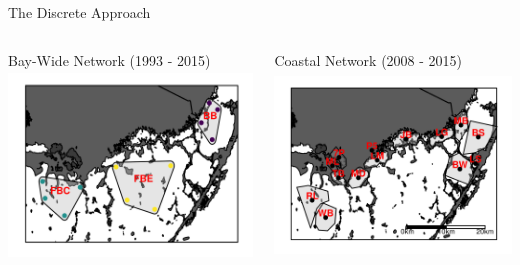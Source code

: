 \documentclass[compress,noflama,nosectionpages]{beamer}
\begin{document}
\begin{frame}{The Discrete Approach}
	\begin{columns}
		\begin{column}[c]{6cm}
			\begin{center}
			Bay-Wide Network (1993 - 2015)
			\includegraphics[height=5cm,clip=true,trim = 0mm 0mm 0mm 0mm,keepaspectratio=true]{figures/fbmap_wqmn.png}%
			\end{center}
		\end{column}
	
		\begin{column}[c]{6cm}
			\begin{center}
			Coastal Network (2008 - 2015)
			\includegraphics[height=5cm,clip=true,trim = 0mm 0mm 0mm 0mm,keepaspectratio=true]{figures/fbmap_dflow.png}%
			\end{center}
		\end{column}
	\end{columns}
\end{frame}
\end{document}
